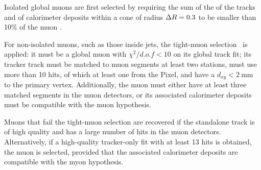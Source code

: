 Isolated global muons are first selected by requiring the
sum of the \pt of the tracks and \ET of calorimeter deposits
within a cone of radius $\Delta R = 0.3$ to be smaller than 10\usep\% of the muon \pt.

For non-isolated muons, such as those inside jets, the tight-muon selection~\cite{CMS-MUO-10-004} is applied:
it must be a global muon with $\chi^2/d.o.f < 10$ on its global track fit;
its tracker track must be matched to muon segments at least two stations,
must use more than 10 hits,
of which at least one from the Pixel,
and have a $d_{xy} < 2~\text{mm}$ to the primary vertex.
Additionally, the muon must either have at least three matched segments in the muon detectors,
or its associated calorimeter deposits must be compatible with the muon hypothesis.

Muons that fail the tight-muon selection are recovered if the standalone track is of high quality
and has a large number of hits in the muon detectors.
Alternatively, if a high-quality tracker-only fit with at least 13 hits is obtained,
the muon is selected, provided that the associated calorimeter deposits are compatible with the myon hypothesis.
